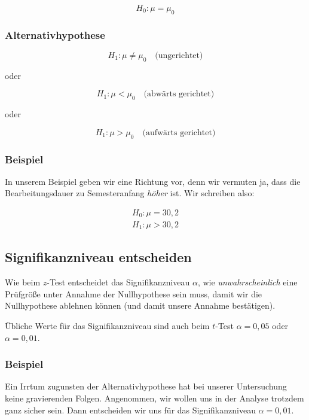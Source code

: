 \documentclass[
  11pt,
  ngerman,
  a4paper,
]{report}
\begin{document}
\[
H_0 : \mu = \mu_0
\label{eq:th0}
\]

\hypertarget{alternativhypothese-1}{%
\subsubsection{Alternativhypothese}\label{alternativhypothese-1}}

\[
H_1 : \mu \neq \mu_0 \quad \textrm{(ungerichtet)}
\label{eq:th1u}
\]

oder

\[
H_1 : \mu < \mu_0 \quad \textrm{(abwärts gerichtet)}
\label{eq:th1l}
\]

oder

\[
H_1 : \mu > \mu_0 \quad \textrm{(aufwärts gerichtet)}
\label{eq:th1g}
\]

\hypertarget{beispiel-7}{%
\subsubsection{Beispiel}\label{beispiel-7}}

In unserem Beispiel geben wir eine Richtung vor, denn wir vermuten ja, dass die Bearbeitungsdauer zu Semesteranfang \emph{höher} ist. Wir schreiben also:

\[\begin{aligned}
H_0: \mu = 30{,}2\\
H_1: \mu>30{,}2
\end{aligned}\]

\hypertarget{signifikanzniveau-entscheiden-1}{%
\subsection{Signifikanzniveau entscheiden}\label{signifikanzniveau-entscheiden-1}}

Wie beim \(z\)-Test entscheidet das Signifikanzniveau \(\alpha\), wie \emph{unwahrscheinlich} eine Prüfgröße unter Annahme der Nullhypothese sein muss, damit wir die Nullhypothese ablehnen können (und damit unsere Annahme bestätigen).

Übliche Werte für das Signifikanzniveau sind auch beim \(t\)-Test \(\alpha=0{,}05\) oder \(\alpha=0{,}01\).

\hypertarget{beispiel-8}{%
\subsubsection{Beispiel}\label{beispiel-8}}

Ein Irrtum zugunsten der Alternativhypothese hat bei unserer Untersuchung keine gravierenden Folgen. Angenommen, wir wollen uns in der Analyse trotzdem ganz sicher sein. Dann entscheiden wir uns für das Signifikanzniveau \(\alpha=0{,}01\).
\end{document}
